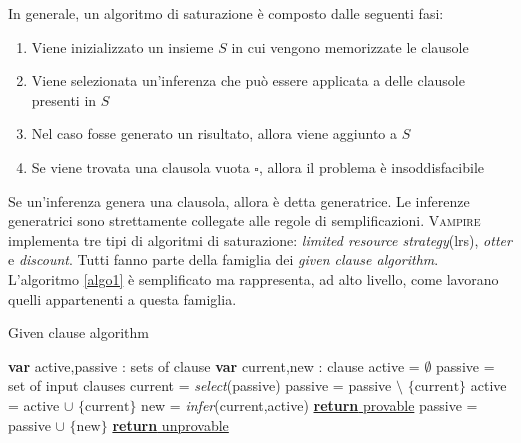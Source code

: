 In generale, un algoritmo di saturazione è composto dalle seguenti fasi:
\begin{enumerate}
    \item Viene inizializzato un insieme $S$ in cui vengono memorizzate le clausole
    \item Viene selezionata un'inferenza che può essere applicata a delle clausole presenti in $S$
    \item Nel caso fosse generato un risultato, allora viene aggiunto a $S$
    \item Se viene trovata una clausola vuota $\square$, allora il problema è insoddisfacibile
\end{enumerate}
Se un'inferenza genera una clausola, allora è detta generatrice. Le inferenze generatrici 
sono strettamente collegate alle regole di semplificazioni.
\newpage
\textsc{Vampire} implementa tre tipi di algoritmi di saturazione: \emph{limited resource strategy}(lrs), \emph{otter} e \emph{discount}.
Tutti fanno parte della famiglia dei \emph{given clause algorithm}. L'algoritmo \ref{algo1} è semplificato ma rappresenta, ad alto livello, come lavorano quelli 
appartenenti a questa famiglia. 
\begin{algorithm}
    \caption{Given clause algorithm}
    \begin{algorithmic}
        \State \textbf{var} active,passive : sets of clause 
        \State \textbf{var} current,new : clause
        \State active = $\emptyset$
        \State passive = set of input clauses
            \State current = \emph{select}(passive)
            \State passive = passive $\setminus$ $\{\text{current}\}$
            \State active = active $\cup$ $\{\text{current}\}$
            \State new = \emph{infer}(current,active)
                \State \underline{\textbf{return} provable}
            \EndIf
            \State passive = passive $\cup$ $\{\text{new}\}$ 
        \EndWhile
        \State \underline{\textbf{return} unprovable}
    \end{algorithmic}
    \label{algo1}
\end{algorithm}

